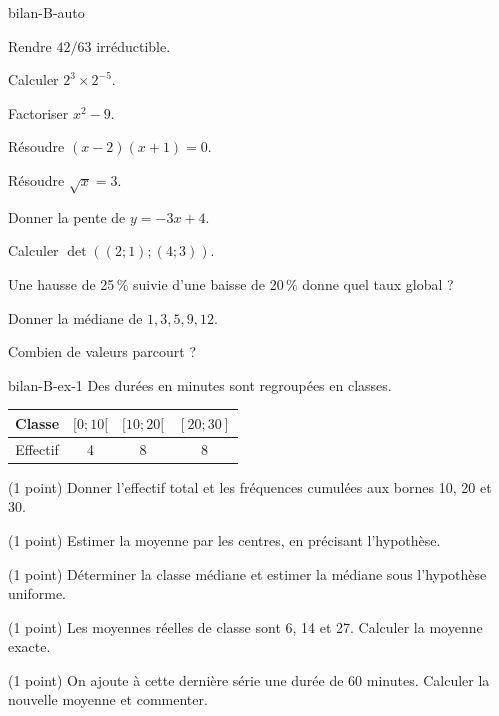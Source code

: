 \begin{blocEdition}{bilan-B-auto}
\begin{questions}
\item Rendre $42/63$ irréductible.
\item Calculer $2^3\times2^{-5}$.
\item Factoriser $x^2-9$.
\item Résoudre $(x-2)(x+1)=0$.
\item Résoudre $\sqrt x=3$.
\item Donner la pente de $y=-3x+4$.
\item Calculer $\det((2;1);(4;3))$.
\item Une hausse de 25\,\% suivie d’une baisse de 20\,\% donne quel taux global ?
\item Donner la médiane de $1,3,5,9,12$.
\item Combien de valeurs parcourt  ?
\end{questions}
\end{blocEdition}
\begin{blocEdition}{bilan-B-ex-1}
Des durées en minutes sont regroupées en classes.\begin{center}\renewcommand{\arraystretch}{1.35}\begin{tabular}{c|ccc}\toprule
Classe & $[0;10[$ & $[10;20[$ & $[20;30]$\\\midrule
Effectif & 4 & 8 & 8\\
\bottomrule\end{tabular}\end{center}\begin{questions}
\item (1 point) Donner l’effectif total et les fréquences cumulées aux bornes 10, 20 et 30.
\item (1 point) Estimer la moyenne par les centres, en précisant l’hypothèse.
\item (1 point) Déterminer la classe médiane et estimer la médiane sous l’hypothèse uniforme.
\item (1 point) Les moyennes réelles de classe sont 6, 14 et 27. Calculer la moyenne exacte.
\item (1 point) On ajoute à cette dernière série une durée de 60 minutes. Calculer la nouvelle moyenne et commenter.
\end{questions}\label{fig-bilan-B-ex-1}

\end{blocEdition}
